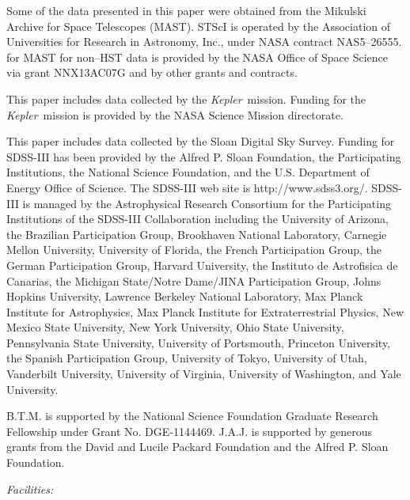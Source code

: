 \documentclass{emulateapj}
\newcommand{\project}[1]{\textsl{#1}}
\newcommand{\kep}{\project{Kepler}}
\newcommand{\todo}[3]{{\color{#2} \emph{#1} TO DO: #3}}
\newcommand{\btmtodo}[1]{\todo{BEN}{red}{#1}}
\begin{document}
Some of the data presented in this paper were obtained from the Mikulski
Archive for Space Telescopes (MAST). 
STScI is operated by the Association of Universities for Research 
in Astronomy, Inc., under NASA contract NAS5--26555. 
for MAST for non--HST data is provided by the NASA Office of Space 
Science via grant NNX13AC07G and by other grants and contracts. 

This paper includes data collected by the \kep\ mission. 
Funding for the \kep\ mission is provided by the NASA Science 
Mission directorate.

This paper includes data collected by the Sloan Digital Sky Survey.
Funding for SDSS-III has been provided by the Alfred P. Sloan Foundation,
the Participating Institutions, the National Science Foundation, and the
U.S. Department of Energy Office of Science. The SDSS-III web site is
http://www.sdss3.org/.
SDSS-III is managed by the Astrophysical Research Consortium for the
Participating Institutions of the SDSS-III Collaboration including the
University of Arizona, the Brazilian Participation Group, Brookhaven
National Laboratory, Carnegie Mellon University, University of Florida,
the French Participation Group, the German Participation Group, Harvard
University, the Instituto de Astrofisica de Canarias, the Michigan
State/Notre Dame/JINA Participation Group, Johns Hopkins University,
Lawrence Berkeley National Laboratory, Max Planck Institute for
Astrophysics, Max Planck Institute for Extraterrestrial Physics, New
Mexico State University, New York University, Ohio State University,
Pennsylvania State University, University of Portsmouth, Princeton
University, the Spanish Participation Group, University of Tokyo,
University of Utah, Vanderbilt University, University of Virginia,
University of Washington, and Yale University.

B.T.M. is supported by the National Science Foundation Graduate Research
Fellowship under Grant No. DGE‐1144469. 
J.A.J. is supported by generous grants from the David and Lucile Packard
Foundation and the Alfred P. Sloan Foundation.



{\it Facilities:} %




\end{document}
